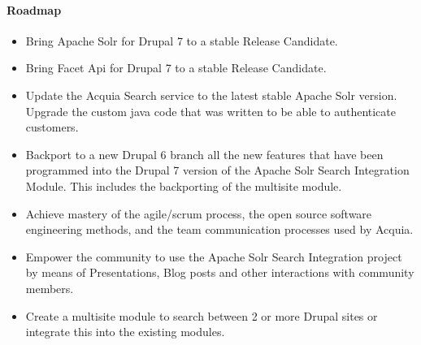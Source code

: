 \paragraph{Roadmap}
\begin{itemize}
  \item Bring Apache Solr \cite{apachesolr_project} for Drupal 7 to a stable Release Candidate.
  \item Bring Facet Api \cite{facetapi_project} for Drupal 7 to a stable Release Candidate.
  \item Update the Acquia Search service \cite{acquia_search} to the latest stable Apache Solr version. Upgrade the custom java code that was written to be able to authenticate customers.
  \item Backport to a new Drupal 6 branch all the new features that have been programmed into the Drupal 7 version of the Apache Solr Search Integration Module. This includes the backporting of the multisite module.
  \item Achieve mastery of the agile/scrum process, the open source software engineering methods, and the team communication processes used by Acquia.
  \item Empower the community to use the Apache Solr Search Integration project by means of Presentations, Blog posts and other interactions with community members.
  \item Create a multisite module to search between 2 or more Drupal sites or integrate this into the existing modules.  
 \end{itemize}